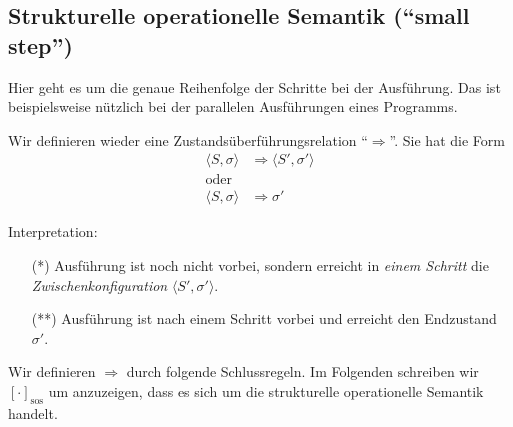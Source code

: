 \subsection{Strukturelle operationelle Semantik (``small step'')}

Hier geht es um die genaue Reihenfolge der Schritte bei der Ausführung. Das ist beispielsweise nützlich bei der parallelen Ausführungen eines Programms.

Wir definieren wieder eine Zustandsüberführungsrelation ``$\Rightarrow$''. Sie hat die Form
\begin{align*}
    \langle S, \sigma \rangle & \Rightarrow \langle S', \sigma' \rangle \tag{*} \\
    \text{oder} \\
    \langle S, \sigma \rangle & \Rightarrow \sigma' \tag{**}
\end{align*}

Interpretation:
\begin{enumerate}
    \item[(*)] Ausführung ist noch nicht vorbei, sondern erreicht in \emph{einem Schritt} die \emph{Zwischenkonfiguration} $\langle S', \sigma' \rangle$.
    \item[(**)] Ausführung ist nach einem Schritt vorbei und erreicht den Endzustand $\sigma'$.
\end{enumerate}



Wir definieren $\Rightarrow$ durch folgende Schlussregeln. Im Folgenden schreiben wir $[\cdot]_{\text{sos}}$ um anzuzeigen, dass es sich um die strukturelle operationelle Semantik handelt.


